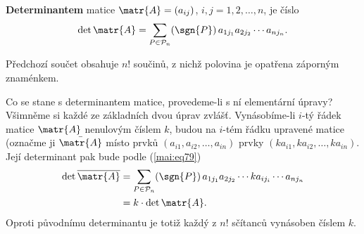       \begin{mdframed}[style=highlight]
        \textbf{Determinantem} matice \(\matr{A}=(a_{ij})\), \(i,j = 1, 2, \ldots, n\), je číslo
        \begin{equation}\label{mai:eq79}
          \begin{gathered}
            \det{\matr{A}} = \sum_{P\in \mathcal{P}_n}(\sgn{P})\,a_{1j_1}a_{2j_2}\cdots a_{nj_n}.
          \end{gathered}
        \end{equation}
      \end{mdframed}
      Předchozí součet obsahuje \(n!\) součinů, z nichž polovina je opatřena záporným znaménkem.
      
      Co se stane s determinantem matice, provedeme-li s ní elementární úpravy? Všimněme si každé ze
      základních dvou úprav zvlášť. Vynásobíme-li \(i\)-tý řádek matice \(\matr{A}\) nenulovým
      číslem \(k\), budou na \(i\)-tém řádku upravené matice (označme ji \(\bar{\matr{A}}\) místo
      prvků \((a_{i1}, a_{i2}, \ldots, a_{in})\)  prvky \((ka_{i1}, ka_{i2}, \ldots, ka_{in})\).
      Její determinant pak bude podle (\ref{mai:eq79})
      \begin{align*}
        \det{\overline{\matr{A}}}  &= \sum_{P\in \mathcal{P}_n}
                                 (\sgn{P})\,a_{1j_1}a_{2j_2}\cdots ka_{ij_i} \cdots a_{nj_n}      \\
                                  &= k\cdot\det{\matr{A}}.
      \end{align*}
      Oproti původnímu determinantu je totiž každý z \(n!\) sčítanců vynásoben číslem \(k\).
      
